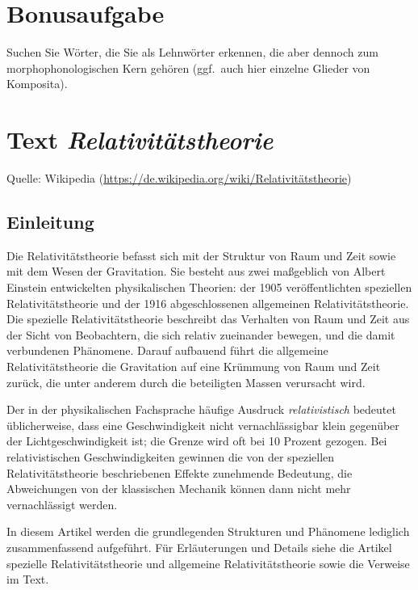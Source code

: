 \section{Bonusaufgabe}

Suchen Sie Wörter, die Sie als Lehnwörter erkennen, die aber dennoch zum morphophonologischen Kern gehören (ggf.\ auch hier einzelne Glieder von Komposita).


\section*{Text \textit{Relativitätstheorie}}

Quelle: Wikipedia (\url{https://de.wikipedia.org/wiki/Relativitätstheorie})

\begin{nohyphens}

\subsection*{Einleitung}

Die Relativitätstheorie befasst sich mit der Struktur von Raum und Zeit sowie mit dem Wesen der Gravitation. Sie besteht aus zwei maßgeblich von Albert Einstein entwickelten physikalischen Theorien: der 1905 veröffentlichten speziellen Relativitätstheorie und der 1916 abgeschlossenen allgemeinen Relativitätstheorie. Die spezielle Relativitätstheorie beschreibt das Verhalten von Raum und Zeit aus der Sicht von Beobachtern, die sich relativ zueinander bewegen, und die damit verbundenen Phänomene. Darauf aufbauend führt die allgemeine Relativitätstheorie die Gravitation auf eine Krümmung von Raum und Zeit zurück, die unter anderem durch die beteiligten Massen verursacht wird.

Der in der physikalischen Fachsprache häufige Ausdruck \textit{relativistisch} bedeutet üblicherweise, dass eine Geschwindigkeit nicht vernachlässigbar klein gegenüber der Lichtgeschwindigkeit ist; die Grenze wird oft bei 10 Prozent gezogen. Bei relativistischen Geschwindigkeiten gewinnen die von der speziellen Relativitätstheorie beschriebenen Effekte zunehmende Bedeutung, die Abweichungen von der klassischen Mechanik können dann nicht mehr vernachlässigt werden.

In diesem Artikel werden die grundlegenden Strukturen und Phänomene lediglich zusammenfassend aufgeführt. Für Erläuterungen und Details siehe die Artikel spezielle Relativitätstheorie und allgemeine Relativitätstheorie sowie die Verweise im Text.



\end{nohyphens}

